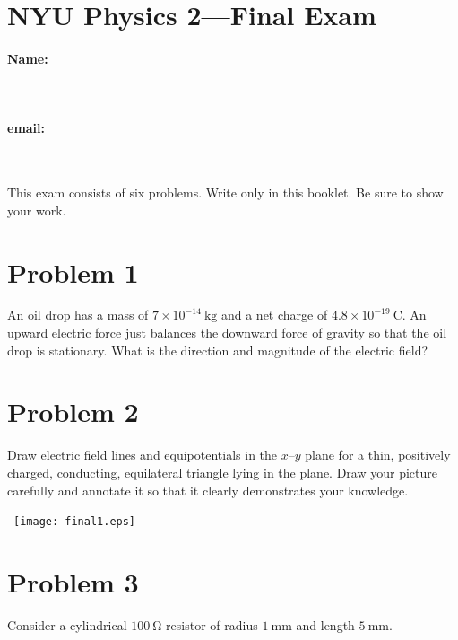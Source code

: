 \documentclass[12pt]{article}
\begin{document}
\thispagestyle{empty}
\setcounter{page}{0}
\section*{NYU Physics 2---Final Exam}

\vfill

\paragraph{Name:} ~
\paragraph{email:} ~

\vfill
\noindent
\resizebox{\textwidth}{!}{}
\vfill

This exam consists of six problems.  Write only in this booklet.  Be
sure to show your work.

\clearpage

\section*{Problem 1}

An oil drop has a mass of $7\times 10^{-14}~\mathrm{kg}$ and a net
charge of $4.8\times 10^{-19}~\mathrm{C}$.  An upward electric force
just balances the downward force of gravity so that the oil drop is
stationary.  What is the direction and magnitude of the electric
field?

\clearpage

\section*{Problem 2}

Draw electric field lines and equipotentials in the $x$--$y$ plane for
a thin, positively charged, conducting, equilateral triangle lying in
the plane.  Draw your picture carefully and annotate it so that it
clearly demonstrates your knowledge.

\vfill

\noindent~\hfill\texttt{[image: final1.eps]}\hfill~

\clearpage

\section*{Problem 3}

Consider a cylindrical $100~\mathrm{\Omega}$ resistor of radius
$1~\mathrm{mm}$ and length $5~\mathrm{mm}$.
\end{document}
